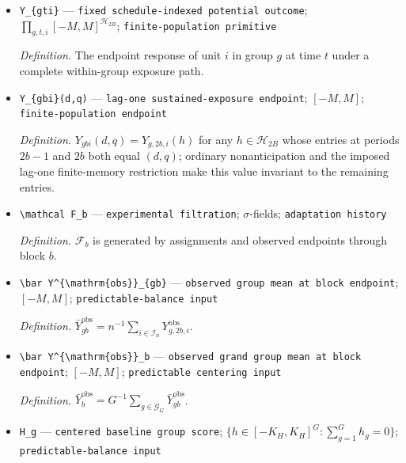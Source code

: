 \documentclass{article}
\begin{document}
\begin{itemize}
  \par\smallskip\noindent\emph{Definition.} The history records own-treatment and group-saturation exposures over all \(2B\) experimental periods.
  \item \texttt{Y\_\allowbreak{}\{gti\}\allowbreak{}} --- \texttt{fixed schedule-\allowbreak{}indexed potential outcome}; \(\prod_{g,t,i}[-M,M]^{\mathcal H_{2B}}\); \texttt{finite-\allowbreak{}population primitive}
  \par\smallskip\noindent\emph{Definition.} The endpoint response of unit \(i\) in group \(g\) at time \(t\) under a complete within-group exposure path.
  \item \texttt{Y\_\allowbreak{}\{gbi\}\allowbreak{}(d,\allowbreak{}q)} --- \texttt{lag-\allowbreak{}one sustained-\allowbreak{}exposure endpoint}; \([-M,M]\); \texttt{finite-\allowbreak{}population endpoint}
  \par\smallskip\noindent\emph{Definition.} \(Y_{gbi}(d,q)=Y_{g,2b,i}(h)\) for any \(h\in\mathcal H_{2B}\) whose entries at periods \(2b-1\) and \(2b\) both equal \((d,q)\); ordinary nonanticipation and the imposed lag-one finite-memory restriction make this value invariant to the remaining entries.
  \item \texttt{\textbackslash{}\allowbreak{}mathcal F\_\allowbreak{}b} --- \texttt{experimental filtration}; \(\sigma\)-fields; \texttt{adaptation history}
  \par\smallskip\noindent\emph{Definition.} \(\mathcal F_b\) is generated by assignments and observed endpoints through block \(b\).
  \item \texttt{\textbackslash{}\allowbreak{}bar Y\textasciicircum{}\{\textbackslash{}\allowbreak{}mathrm\{obs\}\allowbreak{}\}\allowbreak{}\_\allowbreak{}\{gb\}\allowbreak{}} --- \texttt{observed group mean at block endpoint}; \([-M,M]\); \texttt{predictable-\allowbreak{}balance input}
  \par\smallskip\noindent\emph{Definition.} \(\bar Y^{\mathrm{obs}}_{gb}=n^{-1}\sum_{i\in\mathcal I_n}Y^{\mathrm{obs}}_{g,2b,i}\).
  \item \texttt{\textbackslash{}\allowbreak{}bar Y\textasciicircum{}\{\textbackslash{}\allowbreak{}mathrm\{obs\}\allowbreak{}\}\allowbreak{}\_\allowbreak{}b} --- \texttt{observed grand group mean at block endpoint}; \([-M,M]\); \texttt{predictable centering input}
  \par\smallskip\noindent\emph{Definition.} \(\bar Y^{\mathrm{obs}}_b=G^{-1}\sum_{g\in\mathcal G_G}\bar Y^{\mathrm{obs}}_{gb}\).
  \item \texttt{H\_\allowbreak{}g} --- \texttt{centered baseline group score}; \(\{h\in[-K_H,K_H]^G:\sum_{g=1}^Gh_g=0\}\); \texttt{predictable-\allowbreak{}balance input}

\end{itemize}
\end{document}
